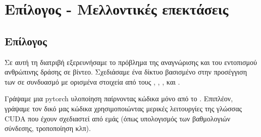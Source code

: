 



% 


% 
\gr 

\chapter{Επίλογος - Μελλοντικές επεκτάσεις}
\section{Επίλογος}
Σε αυτή τη διατριβή εξερευνήσαμε το πρόβλημα της αναγνώρισης και του εντοπισμού ανθρώπινης δράσης σε βίντεο.
Σχεδιάσαμε  ένα δίκτυο βασισμένο στην προσέγγιση των  \cite{DBLP:journals/corr/HouCS17} σε συνδυασμό με ορισμένα στοιχεία από τους \en\cite{DBLP:journals/corr/abs-1712-09184},
\cite{Ren:2015:FRT:2969239.2969250}, \cite{Girshick:2015:FR:2919332.2920125}, \cite{DBLP:journals/corr/abs-1903-00304} \gr
 και \en \cite{hara3dcnns}\gr. \par

 Γράψαμε μια \en pytorch \gr υλοποίηση παίρνοντας κώδικα  μόνο από το \en \cite{jjfaster2rcnn}\gr. Επιπλέον, γράψαμε τον δικό μας κώδικα χρησιμοποιώντας
 μερικές λειτουργίες της γλώσσας \en CUDA \gr που έχουν σχεδιαστεί από εμάς (όπως
υπολογισμός των βαθμολογιών σύνδεσης, τροποποίηση  κλπ). \par

